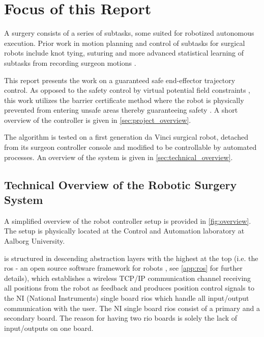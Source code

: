 \section{Focus of this Report}
A surgery consists of a series of subtasks, some suited for robotized autonomous execution. Prior work in motion planning and control of subtasks for surgical robots include knot tying, suturing and more advanced statistical learning of subtasks from recording surgeon motions \citep{bib:raven_debride,bib:raven_observ}.

This report presents the work on a guaranteed safe end-effector trajectory control. As opposed to the safety control by virtual potential field constraints \citep{bib:dlr_miro}, this work utilizes the barrier certificate method where the robot is physically prevented from entering unsafe areas thereby guaranteeing safety \citep{bib:safety}. A short overview of the controller is given in \autoref{sec:project_overview}.

The algorithm is tested on a first generation da Vinci surgical robot, detached from its surgeon controller console and modified to be controllable by automated processes. An overview of the system is given in \autoref{sec:technical_overview}.





\subsection{Technical Overview of the Robotic Surgery System}\label{sec:technical_overview}
A simplified overview of the robot controller setup is provided in \autoref{fig:overview}. The setup is physically located at the Control and Automation laboratory at Aalborg University. 

 is structured in descending abstraction layers with the highest at the top (i.e. the \gls{ros} - an open source software framework for robots \citep{bib:ros}, see \autoref{app:ros} for further details), which establishes a wireless TCP/IP communication channel receiving all positions from the robot as feedback and produces position control signals to the NI (National Instruments) single board \glspl{rio} which handle all input/output communication with the user. The NI single board \glspl{rio} consist of a primary and a secondary board. The reason for having two \gls{rio} boards is solely the lack of input/outputs on one board.

